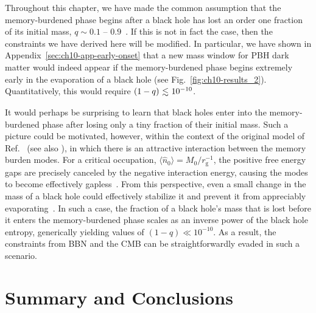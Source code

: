 Throughout this chapter, we have made the common assumption that the memory-burdened phase begins after a black hole has lost an order one fraction of its initial mass, $q \sim 0.1$ -- $0.9$~\cite{Dvali:2020wft, Alexandre:2024nuo, Dvali:2024hsb, Thoss:2024hsr}. If this is not in fact the case, then the constraints we have derived here will be modified. In particular, we have shown in Appendix~\ref{sec:ch10-app-early-onset} that a new mass window for PBH dark matter would indeed appear if the memory-burdened phase begins extremely early in the evaporation of a black hole (see Fig.~\ref{fig:ch10-results_2}). Quantitatively, this would require $(1-q) \lsim 10^{-10}$.

It would perhaps be surprising to learn that black holes enter into the memory-burdened phase after losing only a tiny fraction of their initial mass. Such a picture could be motivated, however, within the context of the original model of Ref.~\cite{Dvali:2020wft} (see also \cite{Dvali:2017ktv, Dvali:2018tqi, Dvali:2018xpy, Dvali:2018ytn,Michel:2023ydf,Thoss:2024hsr,Dvali:2024hsb}), in which there is an attractive interaction between the memory burden modes. For a critical occupation, $\langle \hat{n}_{0} \rangle = M_{0} / r_\mathrm{g}^{-1}$, the positive free energy gaps are precisely canceled by the negative interaction energy, causing the modes to become effectively gapless~\cite{Dvali:2017ktv, Dvali:2018tqi, Dvali:2018xpy, Dvali:2018ytn, Dvali:2020wft}. From this perspective, even a small change in the mass of a black hole could effectively stabilize it and prevent it from appreciably evaporating~\cite{Dvali:2018xpy, Dvali:2018ytn, Dvali:2020wft, Dvali:2021tez, Dvali:2023xfz, Dvali:2024hsb}. In such a case, the fraction of a black hole's mass that is lost before it enters the memory-burdened phase scales as an inverse power of the black hole entropy, generically yielding values of $(1-q) \ll 10^{-10}$. As a result, the constraints from BBN and the CMB can be straightforwardly evaded in such a scenario.



\section{Summary and Conclusions}
\label{sec:ch10-summary}

